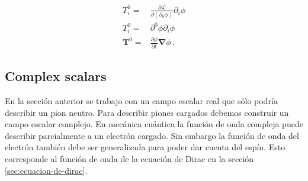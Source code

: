 \begin{align}
  T^0_i=&\frac{\partial\mathcal{L}}{\partial(\partial_0\phi)}{\partial_i\phi}\nonumber\\
  T^0_i=&\partial^0\phi{\partial_i\phi}\nonumber\\
  \mathbf{T}^0=&\frac{\partial\phi}{\partial t}{\boldsymbol{\nabla}\phi}\,.
\end{align}

\subsection{Complex scalars}
En la sección anterior se trabajo con un campo escalar real que sólo podría describir un pion neutro. Para describir piones cargados debemos construir un campo escalar complejo. En mecánica cuántica la función de onda compleja puede describir parcialmente a un electrón cargado. Sin embargo la función de onda del electrón también debe ser generalizada para poder dar cuenta del espín. Esto corresponde al función de onda de la ecuación de Dirac en la sección \ref{sec:ecuacion-de-dirac}.

